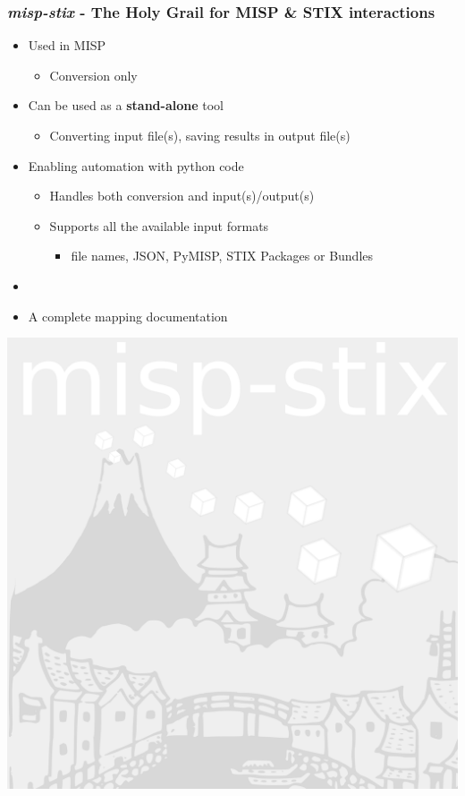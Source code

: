 \begin{frame}
    \frametitle{\emph{misp-stix} - The Holy Grail for MISP \& STIX interactions}
    \begin{minipage}{0.7\textwidth}
        \begin{itemize}
            \item Used in MISP
            \begin{itemize}
                \item Conversion only
            \end{itemize}
            \item Can be used as a \textbf{stand-alone} tool \footnotemark[1]
            \begin{itemize}
                \item Converting input file(s), saving results in output file(s)
            \end{itemize}
            \item Enabling automation with python code
            \begin{itemize}
                \item Handles both conversion and input(s)/output(s)
                \item Supports all the available input formats
                \begin{itemize}
                    \item file names, JSON, PyMISP, STIX Packages or Bundles
                \end{itemize}
            \end{itemize}
        \item []
        \item A complete mapping documentation\footnotemark[2]
        \end{itemize}
    \end{minipage}%
    \begin{minipage}{0.3\textwidth}
        \centering
        \includegraphics[scale=0.2]{images/LOGO_MISP_STIX.png}

\end{minipage}
\end{frame}
